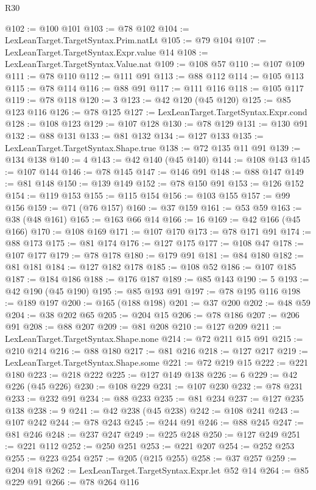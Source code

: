 \begin{lexlean}{R30}
\begin{coremodule}
@102 := @100 @101
@103 := @78 @102
@104 := LexLeanTarget.TargetSyntax.Prim.natLt
@105 := @79 @104
@107 := LexLeanTarget.TargetSyntax.Expr.value @14
@108 := LexLeanTarget.TargetSyntax.Value.nat
@109 := @108 @57
@110 := @107 @109
@111 := @78 @110
@112 := @111 @91
@113 := @88 @112
@114 := @105 @113
@115 := @78 @114
@116 := @88 @91
@117 := @111 @116
@118 := @105 @117
@119 := @78 @118
@120 := 3
@123 := @42 @120 (@45 @120)
@125 := @85 @123 @116
@126 := @78 @125
@127 := LexLeanTarget.TargetSyntax.Expr.cond
@128 := @108 @123
@129 := @107 @128
@130 := @78 @129
@131 := @130 @91
@132 := @88 @131
@133 := @81 @132
@134 := @127 @133
@135 := LexLeanTarget.TargetSyntax.Shape.true
@138 := @72 @135 @11 @91
@139 := @134 @138
@140 := 4
@143 := @42 @140 (@45 @140)
@144 := @108 @143
@145 := @107 @144
@146 := @78 @145
@147 := @146 @91
@148 := @88 @147
@149 := @81 @148
@150 := @139 @149
@152 := @78 @150 @91
@153 := @126 @152
@154 := @119 @153
@155 := @115 @154
@156 := @103 @155
@157 := @99 @156
@159 := @71 (@76 @157)
@160 := @37 @159
@161 := @53 @59
@163 := @38 (@48 @161)
@165 := @163 @66 @14
@166 := 16
@169 := @42 @166 (@45 @166)
@170 := @108 @169
@171 := @107 @170
@173 := @78 @171 @91
@174 := @88 @173
@175 := @81 @174
@176 := @127 @175
@177 := @108 @47
@178 := @107 @177
@179 := @78 @178
@180 := @179 @91
@181 := @84 @180
@182 := @81 @181
@184 := @127 @182 @178
@185 := @108 @52
@186 := @107 @185
@187 := @184 @186
@188 := @176 @187
@189 := @85 @143
@190 := 5
@193 := @42 @190 (@45 @190)
@195 := @85 @193 @91
@197 := @78 @195 @116
@198 := @189 @197
@200 := @165 (@188 @198)
@201 := @37 @200
@202 := @48 @59
@204 := @38 @202 @65
@205 := @204 @15
@206 := @78 @186
@207 := @206 @91
@208 := @88 @207
@209 := @81 @208
@210 := @127 @209
@211 := LexLeanTarget.TargetSyntax.Shape.none
@214 := @72 @211 @15 @91
@215 := @210 @214
@216 := @88 @180
@217 := @81 @216
@218 := @127 @217
@219 := LexLeanTarget.TargetSyntax.Shape.some
@221 := @72 @219 @15
@222 := @221 @180
@223 := @218 @222
@225 := @127 @149 @138
@226 := 6
@229 := @42 @226 (@45 @226)
@230 := @108 @229
@231 := @107 @230
@232 := @78 @231
@233 := @232 @91
@234 := @88 @233
@235 := @81 @234
@237 := @127 @235 @138
@238 := 9
@241 := @42 @238 (@45 @238)
@242 := @108 @241
@243 := @107 @242
@244 := @78 @243
@245 := @244 @91
@246 := @88 @245
@247 := @81 @246
@248 := @237 @247
@249 := @225 @248
@250 := @127 @249
@251 := @221 @112
@252 := @250 @251
@253 := @221 @207
@254 := @252 @253
@255 := @223 @254
@257 := @205 (@215 @255)
@258 := @37 @257
@259 := @204 @18
@262 := LexLeanTarget.TargetSyntax.Expr.let @52 @14
@264 := @85 @229 @91
@266 := @78 @264 @116

\end{coremodule}
\end{lexlean}
